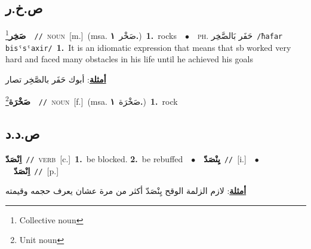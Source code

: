 \documentclass[10pt,a4paper,twoside]{article} %
\begin{document}
\begin{multicols}{2}
{{{{{{{{{{{\vspace{-3mm}
\subsection*{\color{blue}\foreignlanguage{arabic}{ص.خ.ر}\color{blue}{}} 

{\setlength\topsep{0pt}\textbf{\foreignlanguage{arabic}{صَخِر}}\footnote{Collective noun}\ \ {\color{gray}\texttt{//}\color{black}}\ \textsc{noun}\ [m.]\ \color{gray}(msa. \foreignlanguage{arabic}{صَخْر}~\foreignlanguage{arabic}{\textbf{١.}})\color{black}\ \textbf{1.}~rocks\ \ $\bullet$\ \ \textsc{ph.} \color{gray} \foreignlanguage{arabic}{حَفَر بَالصَّخِر}\color{black}\ {\color{gray}\texttt{/{\sffamily ħafar bisˤsˤaxir}/}\color{black}}\ \textbf{1.}~It is an idiomatic expression that means that sb worked very hard and faced many obstacles in his life until he achieved his goals\  \begin{flushright}\color{gray}\foreignlanguage{arabic}{\textbf{\underline{\foreignlanguage{arabic}{أمثلة}}}: أبوك حَفَر بالصَّخِر تصار}\end{flushright}\color{black}} \vspace{2mm}

{\setlength\topsep{0pt}\textbf{\foreignlanguage{arabic}{صَخْرَة}}\footnote{Unit noun}\ \ {\color{gray}\texttt{//}\color{black}}\ \textsc{noun}\ [f.]\ \color{gray}(msa. \foreignlanguage{arabic}{صَخْرَة}~\foreignlanguage{arabic}{\textbf{١.}})\color{black}\ \textbf{1.}~rock\ 

\vspace{-3mm}
\subsection*{\color{blue}\foreignlanguage{arabic}{ص.د.د}\color{blue}{}} 

{\setlength\topsep{0pt}\textbf{\foreignlanguage{arabic}{اِنْصَدّ}}\ {\color{gray}\texttt{//}\color{black}}\ \textsc{verb}\ [c.]\ \textbf{1.}~be blocked.  \textbf{2.}~be rebuffed\ \ $\bullet$\ \ \setlength\topsep{0pt}\textbf{\foreignlanguage{arabic}{يِنْصَدّ}}\ {\color{gray}\texttt{//}\color{black}}\ [i.]\ \ $\bullet$\ \ \setlength\topsep{0pt}\textbf{\foreignlanguage{arabic}{اِنْصَدّ}}\ {\color{gray}\texttt{//}\color{black}}\ [p.]\  \begin{flushright}\color{gray}\foreignlanguage{arabic}{\textbf{\underline{\foreignlanguage{arabic}{أمثلة}}}: لازم الزلمة الوقح يِنْصَدّ أكثر من مرة عشان يعرف حجمه وقيمته}\end{flushright}\color{black}} \vspace{2mm}

}}}}}}}}}}}}
\end{multicols}
\end{document}
